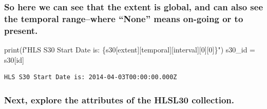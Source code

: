 \documentclass[
  letterpaper,
]{scrartcl}
\newenvironment{Shaded}{}{}
\newcommand{\BuiltInTok}[1]{#1}
\newcommand{\DecValTok}[1]{\textcolor[rgb]{0.25,0.63,0.44}{#1}}
\newcommand{\NormalTok}[1]{#1}
\newcommand{\OperatorTok}[1]{\textcolor[rgb]{0.40,0.40,0.40}{#1}}
\newcommand{\SpecialCharTok}[1]{\textcolor[rgb]{0.25,0.44,0.63}{#1}}
\newcommand{\SpecialStringTok}[1]{\textcolor[rgb]{0.73,0.40,0.53}{#1}}
\newcommand{\StringTok}[1]{\textcolor[rgb]{0.25,0.44,0.63}{#1}}
\begin{document}
\hypertarget{so-here-we-can-see-that-the-extent-is-global-and-can-also-see-the-temporal-rangewhere-none-means-on-going-or-to-present.}{%
\subsubsection{So here we can see that the extent is global, and can
also see the temporal range--where ``None'' means on-going or to
present.}\label{so-here-we-can-see-that-the-extent-is-global-and-can-also-see-the-temporal-rangewhere-none-means-on-going-or-to-present.}}

\begin{Shaded}
\begin{Highlighting}[]
\BuiltInTok{print}\NormalTok{(}\SpecialStringTok{f"HLS S30 Start Date is: }\SpecialCharTok{\{}\NormalTok{s30[}\StringTok{\textquotesingle{}extent\textquotesingle{}}\NormalTok{][}\StringTok{\textquotesingle{}temporal\textquotesingle{}}\NormalTok{][}\StringTok{\textquotesingle{}interval\textquotesingle{}}\NormalTok{][}\DecValTok{0}\NormalTok{][}\DecValTok{0}\NormalTok{]}\SpecialCharTok{\}}\SpecialStringTok{"}\NormalTok{)}
\NormalTok{s30\_id }\OperatorTok{=}\NormalTok{ s30[}\StringTok{\textquotesingle{}id\textquotesingle{}}\NormalTok{]}
\end{Highlighting}
\end{Shaded}

\begin{verbatim}
HLS S30 Start Date is: 2014-04-03T00:00:00.000Z
\end{verbatim}

\hypertarget{next-explore-the-attributes-of-the-hlsl30-collection.}{%
\subsubsection{Next, explore the attributes of the HLSL30
collection.}\label{next-explore-the-attributes-of-the-hlsl30-collection.}}
\end{document}
